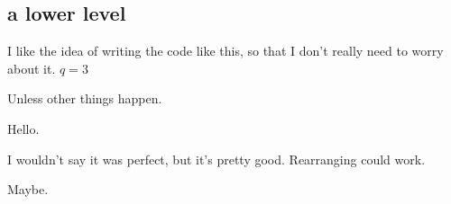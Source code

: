 \documentclass[pre,preprint, 11pt]{revtex4}
\date{27 March 2009}
\begin{document}
\subsection{a lower level}

I like the idea of writing the code like this, so that I don't really need to worry about it.
$q=3$


Unless other things happen. 

Hello. \cite{AnMa}


I wouldn't say it was perfect, but it's pretty good. Rearranging could work.

Maybe.

 



\end{document}
